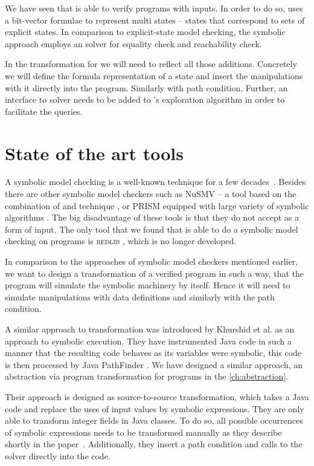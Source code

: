 \begin{summary}
We have seen that \SymDIVINE is able to verify programs with inputs. In order to
do so, \SymDIVINE uses a bit-vector formulae to represent multi states --
states that correspond to sets of explicit states. In comparison to
explicit-state model checking, the symbolic approach employs an \SMT solver for
equality check and reachability check.

In the transformation for \DIVINE we will need to reflect all those additions.
Concretely we will define the formula representation of a state and insert
the manipulations with it directly into the program. Similarly with path
condition.  Further, an interface to \SMT solver needs to be added to
\DIVINE's exploration algorithm in order to facilitate the \SMT queries.
\end{summary}

\section{State of the art tools}

A symbolic model checking is a well-known technique for a few
decades~\cite{McMillan93}. Besides \SymDIVINE there are other symbolic
model checkers such as NuSMV -- a tool based on the combination of \SMT and \BDD
technique \cite{Cimatti20}, or PRISM equipped with large variety of symbolic
algorithms \cite{Kwiatkowska20}. The big disadvantage of these tools is that
they do not accept \Cpp{} as a form of input. The only tool that we found that
is able to do a symbolic model checking on \Cpp{} programs is \textsc{redlib}
\cite{redlib}, which is no longer developed.

In comparison to the approaches of symbolic model checkers mentioned earlier, we
want to design a transformation of a verified program in such a way, that the
program will simulate the symbolic machinery by itself. Hence it will need to
simulate manipulations with data definitions and similarly with the path
condition.

A similar approach to transformation was introduced by Khurshid et al.
\cite{Khurshid03} as an approach to symbolic execution. They have instrumented
Java code in such a manner that the resulting code behaves as its variables were
symbolic, this code is then processed by Java PathFinder \cite{Havelund20}. We
have designed a similar approach, an abstraction via program transformation for
\LLVM programs in the \autoref{ch:abstraction}.

Their approach is designed as source-to-source transformation, which takes a
Java code and replace the uses of input values by symbolic expressions. They are
only able to transform integer fields in Java classes. To do so, all possible
occurrences of symbolic expressions needs to be transformed manually as they
describe shortly in the paper~\cite{Khurshid03}. Additionally, they insert a
path condition and calls to the solver directly into the code.

